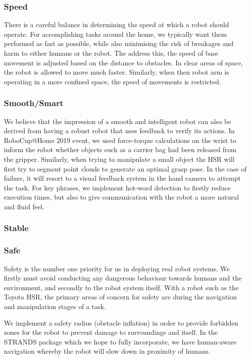 \documentclass[runningheads,a4paper]{llncs}
\begin{document}
\subsubsection{Speed}
There is a careful balance in determining the speed at which a robot should operate. For accomplishing tasks around the home, we typically want them performed as fast as possible, while also minimising the risk of breakages and harm to either humans or the robot. The address this, the speed of base movement is adjusted based on the distance to obstacles. In clear areas of space, the robot is allowed to move much faster. Similarly, when then robot arm is operating in a more confined space, the speed of movements is restricted.

\subsubsection{Smooth/Smart}
We believe that the impression of a smooth and intelligent robot can also be derived from having a robust robot that uses feedback to verify its actions. In RoboCup@Home 2019 event, we used force-torque calculations on the wrist to inform the robot whether objects such as a carrier bag had been released from the gripper. Similarly, when trying to manipulate a small object the HSR will first try to segment point clouds to generate an optimal grasp pose. In the case of failure, it will resort to a visual feedback system in the hand camera to attempt the task. For key phrases, we implement hot-word detection to firstly reduce execution times, but also to give communication with the robot a more natural and fluid feel. 

\subsubsection{Stable}


\subsubsection{Safe}
Safety is the number one priority for us in deploying real robot systems. We firstly must avoid conducting any dangerous behaviour towards humans and the environment, and secondly to the robot system itself. With a robot such as the Toyota HSR, the primary areas of concern for safety are during the navigation and manipulation stages of a task. 

We implement a safety radius (obstacle inflation) in order to provide forbidden zones for the robot to prevent damage to surroundings and itself. In the STRANDS package which we hope to fully incorporate, we have human-aware navigation whereby the robot will slow down in proximity of humans. 
\end{document}
